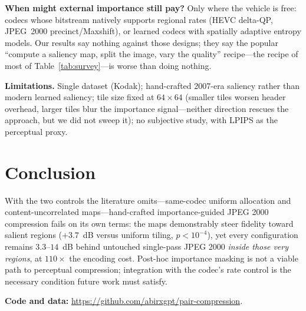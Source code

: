 \documentclass[conference]{IEEEtran}
\begin{document}
\textbf{When might external importance still pay?} Only where the vehicle is
free: codecs whose bitstream natively supports regional rates (HEVC delta-QP,
JPEG~2000 precinct/Maxshift), or learned codecs with spatially adaptive
entropy models. Our results say nothing against those designs; they say the
popular ``compute a saliency map, split the image, vary the quality''
recipe---the recipe of most of Table~\ref{tab:survey}---is worse than doing
nothing.

\textbf{Limitations.} Single dataset (Kodak); hand-crafted 2007-era saliency
rather than modern learned saliency; tile size fixed at $64{\times}64$
(smaller tiles worsen header overhead, larger tiles blur the importance
signal---neither direction rescues the approach, but we did not sweep it);
no subjective study, with LPIPS as the perceptual proxy.

\section{Conclusion}
With the two controls the literature omits---same-codec uniform allocation
and content-uncorrelated maps---hand-crafted importance-guided JPEG 2000
compression fails on its own terms: the maps demonstrably steer fidelity
toward salient regions ($+3.7$~dB versus uniform tiling, $p{<}10^{-4}$), yet
every configuration remains $3.3$--$14$~dB behind untouched single-pass
JPEG 2000 \emph{inside those very regions}, at $110\times$ the encoding
cost. Post-hoc importance masking is not a viable path to perceptual
compression; integration with the codec's rate control is the necessary
condition future work must satisfy.

\textbf{Code and data:} \url{https://github.com/abirxgpt/pair-compression}.
\end{document}
